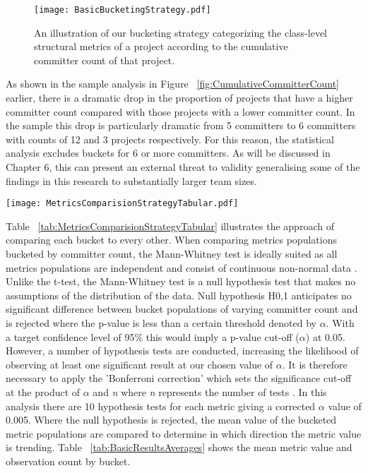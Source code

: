 \begin{figure}[htbp!] 
\centering    
\texttt{[image: BasicBucketingStrategy.pdf]}
\caption{An illustration of our bucketing strategy categorizing the class-level structural metrics of a project according to the cumulative committer count of that project.}
\label{fig:BasicBucketingStrategy}
\end{figure}

As shown in the sample analysis in Figure ~\ref{fig:CumulativeCommitterCount} earlier, there is a dramatic drop in the proportion of projects that have a higher committer count compared with those projects with a lower committer count. In the sample this drop is particularly dramatic from 5 committers to 6 committers with counts of 12 and 3 projects respectively. For this reason, the statistical analysis excludes buckets for 6 or more committers. As will be discussed in Chapter 6, this can present an external threat to validity generalising some of the findings in this research to substantially larger team sizes. 

\begin{table}
\centering 
\caption{The bucketed metric comparison strategy.}
\begin{tabular}
 \centering 
 \texttt{[image: MetricsComparisionStrategyTabular.pdf]}
 \label{tab:MetricsComparisionStrategyTabular}
\end{tabular}
\end{table}

Table ~\ref{tab:MetricsComparisionStrategyTabular} illustrates the approach of comparing each bucket to every other. When comparing metrics populations bucketed by committer count, the Mann-Whitney test is ideally suited as all metrics populations are independent and consist of continuous non-normal data \citep{mann1947test}. Unlike the t-test, the Mann-Whitney test is a null hypothesis test that makes no assumptions of the distribution of the data. Null hypothesis H0,1 anticipates no significant difference between bucket populations of varying committer count and is rejected where the p-value is less than a certain threshold denoted by $\alpha$. With a target confidence level of 95\% this would imply a p-value cut-off ($\alpha$) at 0.05. However, a number of hypothesis tests are conducted, increasing the likelihood of observing at least one significant result at our chosen value of $\alpha$. It is therefore necessary to apply the 'Bonferroni correction' which sets the significance cut-off at the product of $\alpha$ and \textit{n} where \textit{n} represents the number of tests \citep{bonferroni1936teoria}. In this analysis there are 10 hypothesis tests for each metric giving a corrected $\alpha$ value of 0.005. Where the null hypothesis is rejected, the mean value of the bucketed metric populations are compared to determine in which direction the metric value is trending. Table ~\ref{tab:BasicResultsAverages} shows the mean metric value and observation count by bucket.

